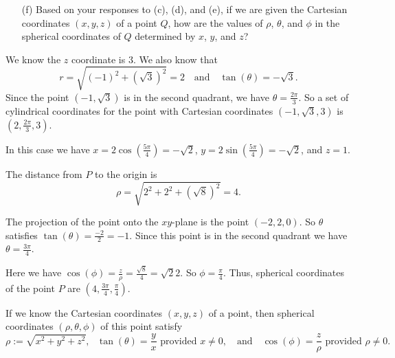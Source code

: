 \begin{pa}
\begin{enumerate}
     \item[(f)] Based on your responses to (c), (d), and (e), if we are given the Cartesian coordinates $(x,y,z)$ of a point $Q$, how are the values of $\rho$, $\theta$, and $\phi$ in the spherical coordinates of $Q$ determined by $x$, $y$, and $z$?

     

    \end{enumerate}

\end{pa} 

\begin{activitySolution} 

    \ba
    \item We know the $z$ coordinate is $3$. We also know that
\[r = \sqrt{(-1)^2 + (\sqrt{3})^2} = 2 \ \ \ \text{ and } \ \ \ \tan(\theta) = -\sqrt{3}.\]
Since the point $(-1,\sqrt{3})$ is in the second quadrant, we have $\theta = \frac{2\pi}{3}$. So a set of cylindrical coordinates for the point with Cartesian coordinates $(-1, \sqrt{3}, 3)$ is $\left(2, \frac{2\pi}{3}, 3\right)$.

	
	\item In this case we have $x = 2\cos\left(\frac{5\pi}{4}\right) = -\sqrt{2}$, $y =2\sin\left(\frac{5\pi}{4}\right) = -\sqrt{2}$, and $z=1$. 


    \item The distance from $P$ to the origin is
\[\rho = \sqrt{2^2+2^2+(\sqrt{8})^2} = 4.\]

     \item  The projection of the point onto the $xy$-plane is the point $(-2,2,0)$. So $\theta$ satisfies $\tan(\theta) = \frac{-2}{2}=-1$. Since this point is in the second quadrant we have $\theta = \frac{3\pi}{4}$.

     \item Here we have $\cos(\phi) = \frac{z}{\rho} = \frac{\sqrt{8}}{4} = \sqrt{2}{2}$. So $\phi = \frac{\pi}{4}$. Thus, spherical coordinates of the point $P$ are $\left(4, \frac{3\pi}{4}, \frac{\pi}{4}\right)$.  

     \item If we know the Cartesian coordinates $(x,y,z)$ of a point, then spherical coordinates $(\rho, \theta, \phi)$ of this point satisfy
\[\rho :=\sqrt{x^2+y^2+z^2}, \ \ \ \tan(\theta) = \frac{y}{x} \text{ provided } x\neq 0, \ \ \ \text{ and } \ \ \ \cos(\phi) = \frac{z}{\rho} \text{ provided } \rho \neq 0.\]

	\ea

\end{activitySolution}


\afterpa 